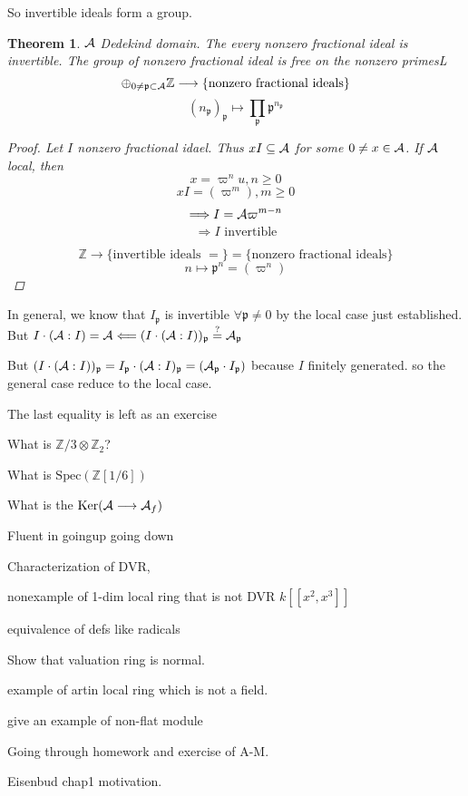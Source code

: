 \documentclass[11pt]{article}
\newtheorem{thm}{Theorem}[section]
\newcommand{\intg}{\mathbb Z}
\newcommand{\scp}{{\mathfrak p}}
\newcommand{\cala}{{\cal A}}
\newcommand{\Lrta}{\Longrightarrow}
\newcommand{\lrta}{\longrightarrow}
\newcommand{\Llta}{\Longleftarrow}
\begin{document}
So invertible ideals form a group.
\begin{thm}
$\cala$ Dedekind domain. The every nonzero fractional ideal is invertible. The group of nonzero fractional ideal is free on the nonzero primesL
$$
\oplus_{0\neq \scp\subset\cala}\intg\lrta \{\text{nonzero fractional ideals}\}
$$
$$
(n_\scp)_\scp\longmapsto \prod_\scp\scp^{n_\scp}
$$
\begin{proof}
Let $I$ nonzero fractional idael. Thus $xI \subseteq\cala$ for some $0\neq x\in \cala$. If $\cala$ local, then
$$
x=\varpi^nu,n\geq 0
$$
$$
xI=(\varpi^m),m\geq 0
$$
$$
\Lrta I=\cala\varpi^{m-n}
$$
$$
\Lrta I\text{ invertible}
$$

$$
\intg\lrta \{\text{invertible ideals }=\}=\{\text{nonzero fractional ideals}\}
$$
$$
n\longmapsto \scp^n=(\varpi^n)
$$
\end{proof}
\end{thm}

In general, we know that $I_\scp$ is invertible $\forall \scp\neq 0$ by the local case just established. But $I\cdot(\cala:I)=\cala\Llta (I\cdot (\cala:I))_\scp\overset{?}{=}\cala_\scp$

But $(I\cdot (\cala:I))_\scp=I_\scp\cdot (\cala: I)_\scp=(\cala_\scp\cdot I_\scp)$ because $I$ finitely generated. so the general case reduce to the local case.

The last equality is left as an exercise


What is $\intg/3\otimes \intg_2$?

What is $\text{Spec}(\intg[1/6])$

What is the $\text{Ker}(\cala\lrta \cala_f)$

Fluent in goingup going down

Characterization of DVR,

nonexample of 1-dim local ring that is not DVR $k[[x^2,x^3]]$

equivalence of defs like radicals

Show that valuation ring is normal.

example of artin local ring which is not a field.

give an example of non-flat module

Going through homework and exercise of A-M.

Eisenbud chap1 motivation.
\end{document}
